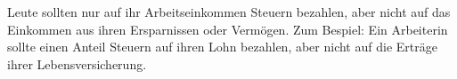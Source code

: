 Leute sollten nur auf ihr Arbeitseinkommen Steuern bezahlen, aber nicht auf das Einkommen aus ihren Ersparnissen oder Vermögen.
Zum Bespiel: Ein Arbeiterin sollte einen Anteil Steuern auf ihren Lohn bezahlen, aber nicht auf die Erträge ihrer Lebensversicherung.